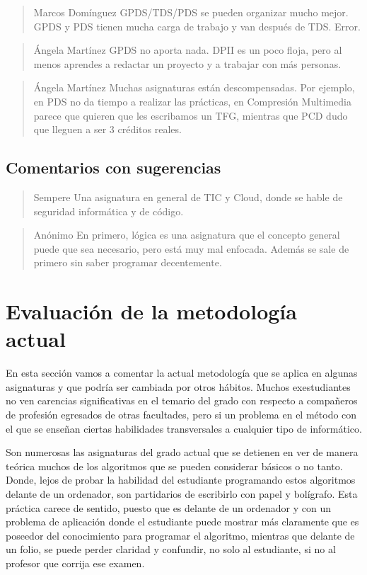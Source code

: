 \begin{quote}{Marcos Domínguez}
    GPDS/TDS/PDS se pueden organizar mucho mejor.
    GPDS y PDS tienen mucha carga de trabajo y van después de TDS.
    Error.
\end{quote}

\begin{quote}{Ángela Martínez}
    GPDS no aporta nada. DPII es un poco floja, pero al menos 
    aprendes a redactar un proyecto y a trabajar con más personas.
\end{quote}

\begin{quote}{Ángela Martínez}
    Muchas asignaturas están descompensadas.
    Por ejemplo, en PDS no da tiempo a realizar las prácticas,
    en Compresión Multimedia parece que quieren que les escribamos un TFG,
    mientras que PCD dudo que lleguen a ser 3 créditos reales. 
\end{quote}

\subsection{Comentarios con sugerencias}

\begin{quote}{Sempere}
    Una asignatura en general de TIC y Cloud,
    donde se hable de seguridad informática y de código.
\end{quote}

\begin{quote}{Anónimo}
    En primero, lógica es una asignatura que el concepto general puede que 
    sea necesario, pero está muy mal enfocada. Además se sale de primero 
    sin saber programar decentemente.
\end{quote}

\section{Evaluación de la metodología actual}

En esta sección vamos a comentar la actual metodología
que se aplica en algunas asignaturas y que podría ser
cambiada por otros hábitos. Muchos exestudiantes no ven 
carencias significativas en el temario del grado con 
respecto a compañeros de profesión egresados de otras 
facultades, pero si un problema en el método con el que 
se enseñan ciertas habilidades transversales a cualquier 
tipo de informático.

Son numerosas las asignaturas del grado actual que 
se detienen en ver de manera teórica muchos de los
algoritmos que se pueden considerar básicos o no tanto.
Donde, lejos de probar la habilidad del estudiante programando
estos algoritmos delante de un ordenador, son partidarios
de escribirlo con papel y bolígrafo. Esta práctica carece 
de sentido, puesto que es delante de un ordenador y con 
un problema de aplicación donde el estudiante puede mostrar 
más claramente que es poseedor del conocimiento para programar
el algoritmo, mientras que delante de un folio, se puede perder 
claridad y confundir, no solo al estudiante, si no al profesor que 
corrija ese examen.


